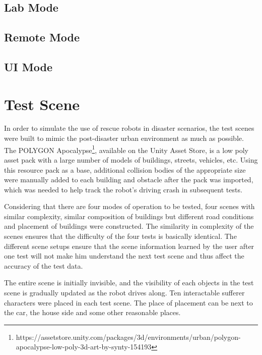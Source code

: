 \subsection{Lab Mode}
\subsection{Remote Mode}
\subsection{UI Mode}


\section{Test Scene}
In order to simulate the use of rescue robots in disaster scenarios, the test scenes were built to mimic the post-disaster urban environment as much as possible. The POLYGON Apocalypse\footnote{https://assetstore.unity.com/packages/3d/environments/urban/polygon-apocalypse-low-poly-3d-art-by-synty-154193}, available on the Unity Asset Store, is a low poly asset pack with a large number of models of buildings, streets, vehicles, etc. Using this resource pack as a base, additional collision bodies of the appropriate size were manually added to each building and obstacle after the pack was imported, which was needed to help track the robot's driving crash in subsequent tests.

Considering that there are four modes of operation to be tested, four scenes with similar complexity, similar composition of buildings but different road conditions and placement of buildings were constructed. The similarity in complexity of the scenes ensures that the difficulty of the four tests is basically identical. The different scene setups ensure that the scene information learned by the user after one test will not make him understand the next test scene and thus affect the accuracy of the test data. 

The entire scene is initially invisible, and the visibility of each objects in the test scene is gradually updated as the robot drives along. Ten interactable sufferer characters were placed in each test scene. The place of placement can be next to the car, the house side and some other reasonable places.
